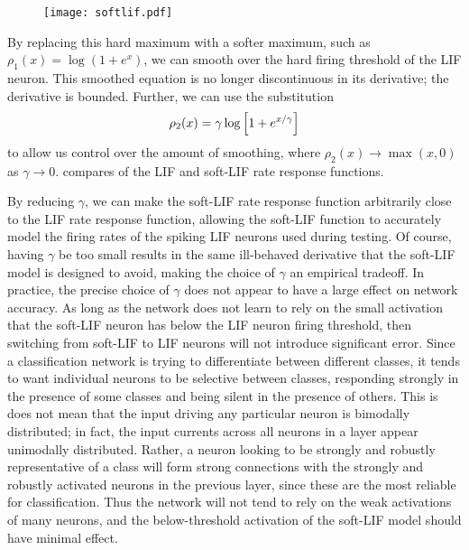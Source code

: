 \begin{figure}
  \centering
  \texttt{[image: softlif.pdf]}
\end{figure}

By replacing this hard maximum with a softer maximum,
such as $\rho_1(x) = \log(1 + e^x)$,
we can smooth over the hard firing threshold of the LIF neuron.
This smoothed equation is no longer discontinuous in its derivative;
the derivative is bounded.
Further, we can use the substitution
\begin{align}
  \rho_2(x) = \gamma \log\left[1 + e^{x / \gamma}\right]
  \eqnlabel{softrelusigma}
\end{align}
to allow us control over the amount of smoothing,
where $\rho_2(x) \to \max(x, 0)$ as $\gamma \to 0$.
 compares of the LIF and soft-LIF rate response functions.

By reducing $\gamma$, we can make the soft-LIF rate response function
arbitrarily close to the LIF rate response function,
allowing the soft-LIF function to accurately model
the firing rates of the spiking LIF neurons used during testing.
Of course, having $\gamma$ be too small results in the same
ill-behaved derivative that the soft-LIF model is designed to avoid,
making the choice of $\gamma$ an empirical tradeoff.
In practice,
the precise choice of $\gamma$ does not appear to have
a large effect on network accuracy.
As long as the network does not learn to rely on the small activation
that the soft-LIF neuron has below the LIF neuron firing threshold,
then switching from soft-LIF to LIF neurons will not introduce significant error.
Since a classification network is trying to differentiate between different classes,
it tends to want individual neurons to be selective between classes,
responding strongly in the presence of some classes
and being silent in the presence of others.
This is does not mean that the input driving any particular neuron
is bimodally distributed;
in fact, the input currents across all neurons in a layer
appear unimodally distributed.
Rather, a neuron looking to be strongly and robustly representative of a class
will form strong connections with the strongly and robustly activated neurons
in the previous layer,
since these are the most reliable for classification.
Thus the network will not tend to rely on the weak activations of many neurons,
and the below-threshold activation of the soft-LIF model
should have minimal effect.

